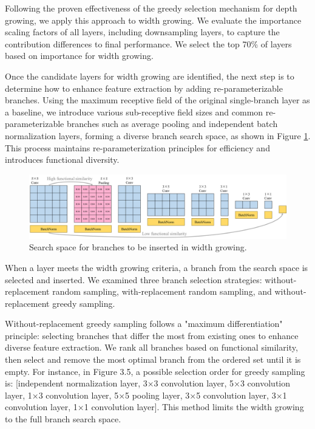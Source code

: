 \documentclass[preprint,12pt]{elsarticle}
\begin{document}
Following the proven effectiveness of the greedy selection mechanism for depth growing, we apply this approach to width growing. We evaluate the importance scaling factors of all layers, including downsampling layers, to capture the contribution differences to final performance. We select the top 70\% of layers based on importance for width growing.

Once the candidate layers for width growing are identified, the next step is to determine how to enhance feature extraction by adding re-parameterizable branches. Using the maximum receptive field of the original single-branch layer as a baseline, we introduce various sub-receptive field sizes and common re-parameterizable branches such as average pooling and independent batch normalization layers, forming a diverse branch search space, as shown in Figure \ref{fig:branches}. This process maintains re-parameterization principles for efficiency and introduces functional diversity.

\begin{figure}
  \centering
  \includegraphics[width=\textwidth]{imgs/branches.png}
  \caption{Search space for branches to be inserted in width growing.}
  \label{fig:branches}
\end{figure}

When a layer meets the width growing criteria, a branch from the search space is selected and inserted. We examined three branch selection strategies: without-replacement random sampling, with-replacement random sampling, and without-replacement greedy sampling.

Without-replacement greedy sampling follows a "maximum differentiation" principle: selecting branches that differ the most from existing ones to enhance diverse feature extraction. We rank all branches based on functional similarity, then select and remove the most optimal branch from the ordered set until it is empty. For instance, in Figure 3.5, a possible selection order for greedy sampling is: [independent normalization layer, 3×3 convolution layer, 5×3 convolution layer, 1×3 convolution layer, 5×5 pooling layer, 3×5 convolution layer, 3×1 convolution layer, 1×1 convolution layer]. This method limits the width growing to the full branch search space.
\end{document}
